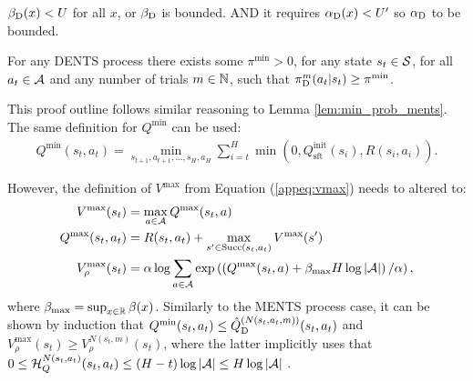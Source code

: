          ${\beta_{{\textnormal{D}}}}(x) < U$ for all $x$, or ${\beta_{{\textnormal{D}}}}$ is bounded. AND it requires ${\alpha_{{\textnormal{D}}}}(x) < U'$ so ${\alpha_{{\textnormal{D}}}}$ to be bounded.
        \begin{lemma} \label{lem:min_prob_dents}
            For any DENTS process there exists some $\pi^{\min}>0$, for any state $s_t\in\mathcal{S}$, for all $a_t\in\mathcal{A}$ and any number of trials $m\in\mathbb{N}$, such that ${\pi^{m}_{{\textnormal{D}}}}(a_t|s_t)\geq\pi^{\min}$.
        \end{lemma}
        \begin{proofoutline}
            This proof outline follows similar reasoning to Lemma \ref{lem:min_prob_ments}. The same definition for $Q^{\min}$ can be used:
            \begin{align}
                Q^{\min}(s_t,a_t) = \min_{s_{t+1},a_{t+1},...,s_H,a_H} \sum_{i=t}^H \min(0, Q^{\text{init}}_{\text{sft}}(s_i), R(s_i,a_i)).
            \end{align}

            However, the definition of $V^{\max}$ from Equation (\ref{appeq:vmax}) needs to altered to:
            \begin{align}
                V^{\max}(s_t) &= \max_{a\in\mathcal{A}} Q^{\max}(s_t,a) \\
                Q^{\max}(s_t,a_t) &= R(s_t,a_t) + \max_{s'\in{\textnormal{Succ}(s_t,a_t)}} V^{\max}(s') \\
                V_\rho^{\max}(s_t) &= \alpha \log \sum_{a\in\mathcal{A}} \exp \left(\left(Q^{\max}(s_t,a) + \beta_{\max}H\log|\mathcal{A}| \right)/\alpha\right), 
            \end{align}
            where $\beta_{\max}=\sup_{x\in\mathbb{R}}\beta(x)$. Similarly to the MENTS process case, it can be shown by induction that $Q^{\min}(s_t,a_t)\leq {\hat{Q}^{(N(s_t,a_t,m))}_{{\textnormal{D}}}}(s_t,a_t)$ and $V_\rho^{\max}(s_t)\geq V_{\rho}^{N(s_t,m)}(s_t)$, where the latter implicitly uses that $0 \leq \mathcal{H}_Q^{N(s_t,a_t)}(s_t,a_t) \leq (H-t)\log|\mathcal{A}| \leq H\log|\mathcal{A}|$ . 
            

\end{proofoutline}

